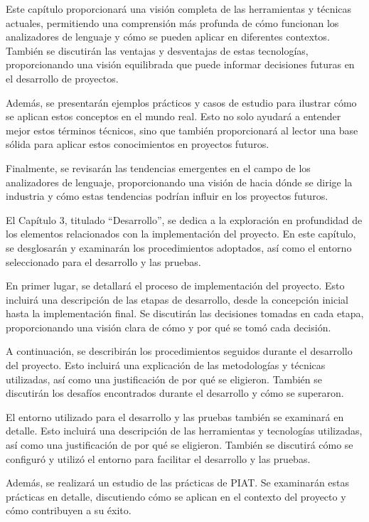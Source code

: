 Este capítulo proporcionará una visión completa de las herramientas y técnicas actuales, permitiendo una comprensión más profunda de cómo funcionan los analizadores de lenguaje y cómo se pueden aplicar en diferentes contextos. También se discutirán las ventajas y desventajas de estas tecnologías, proporcionando una visión equilibrada que puede informar decisiones futuras en el desarrollo de proyectos.

Además, se presentarán ejemplos prácticos y casos de estudio para ilustrar cómo se aplican estos conceptos en el mundo real. Esto no solo ayudará a entender mejor estos términos técnicos, sino que también proporcionará al lector una base sólida para aplicar estos conocimientos en proyectos futuros.

Finalmente, se revisarán las tendencias emergentes en el campo de los analizadores de lenguaje, proporcionando una visión de hacia dónde se dirige la industria y cómo estas tendencias podrían influir en los proyectos futuros.

El Capítulo 3, titulado “Desarrollo”, se dedica a la exploración en profundidad de los elementos relacionados con la implementación del proyecto. En este capítulo, se desglosarán y examinarán los procedimientos adoptados, así como el entorno seleccionado para el desarrollo y las pruebas.

En primer lugar, se detallará el proceso de implementación del proyecto. Esto incluirá una descripción de las etapas de desarrollo, desde la concepción inicial hasta la implementación final. Se discutirán las decisiones tomadas en cada etapa, proporcionando una visión clara de cómo y por qué se tomó cada decisión.

A continuación, se describirán los procedimientos seguidos durante el desarrollo del proyecto. Esto incluirá una explicación de las metodologías y técnicas utilizadas, así como una justificación de por qué se eligieron. También se discutirán los desafíos encontrados durante el desarrollo y cómo se superaron.

El entorno utilizado para el desarrollo y las pruebas también se examinará en detalle. Esto incluirá una descripción de las herramientas y tecnologías utilizadas, así como una justificación de por qué se eligieron. También se discutirá cómo se configuró y utilizó el entorno para facilitar el desarrollo y las pruebas.

Además, se realizará un estudio de las prácticas de PIAT. Se examinarán estas prácticas en detalle, discutiendo cómo se aplican en el contexto del proyecto y cómo contribuyen a su éxito.

